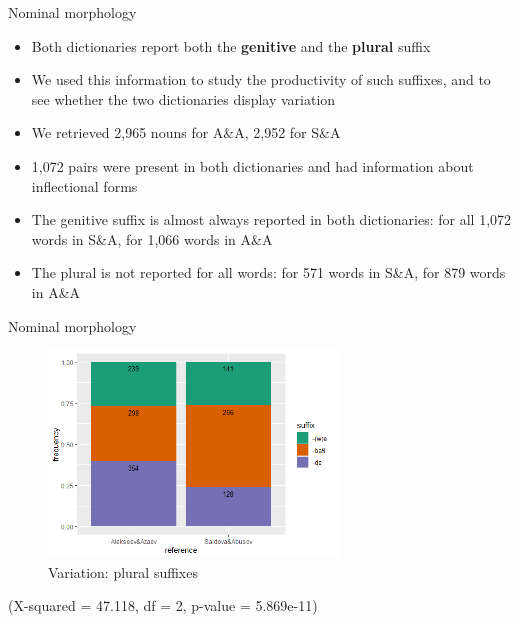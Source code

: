 \begin{frame}{Nominal morphology}
\begin{itemize}
    \item Both dictionaries report both the \textbf{genitive} and the \textbf{plural} suffix
    \item We used this information to study the productivity of such suffixes, and to see whether the two dictionaries display variation
    \pause
    \item We retrieved 2,965 nouns for A\&A, 2,952 for S\&A
    \item 1,072 pairs were present in both dictionaries and had information about inflectional forms
    \pause
    \item The genitive suffix is almost always reported in both dictionaries: for all 1,072 words in S\&A, for 1,066 words in A\&A
    \item The plural is not reported for all words: for 571 words in S\&A, for 879 words in A\&A %
\end{itemize}
\end{frame}

\begin{frame}{Nominal morphology}
\begin{figure}[h]
\caption{Variation: plural suffixes}
\centering
\includegraphics[height=5.5cm]{images/plural.png}
\end{figure}
\small (X-squared = 47.118, df = 2, p-value = 5.869e-11)
\end{frame}

